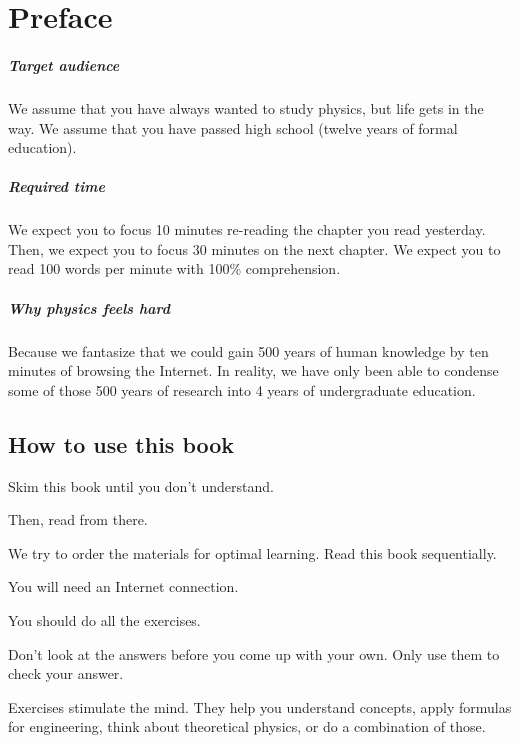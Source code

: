 \chapter{Preface}


\paragraph{Target audience}
We assume that you have always wanted to study physics, but life gets in the way.
We assume that you have passed high school (twelve years of formal education).

\paragraph{Required time}
We expect you to focus 10 minutes re-reading the chapter you read yesterday.
Then, we expect you to focus 30 minutes on the next chapter.
We expect you to read 100 words per minute
with 100\% comprehension.

\paragraph{Why physics feels hard}
Because we fantasize that we could gain 500 years of human knowledge
by ten minutes of browsing the Internet.
In reality, we have only been able to
condense some of those 500 years of research
into 4 years of undergraduate education.

\section{How to use this book}

Skim this book until you don't understand.

Then, read from there.

We try to order the materials for optimal learning.
Read this book sequentially.

You will need an Internet connection.

You should do all the exercises.

Don't look at the answers before you come up with your own.
Only use them to check your answer.

Exercises stimulate the mind.
They help you understand concepts,
apply formulas for engineering,
think about theoretical physics,
or do a combination of those.

